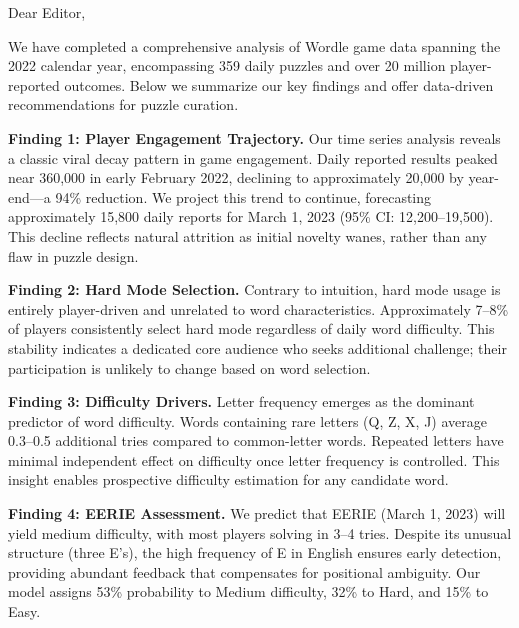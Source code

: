 \documentclass{mcmthesis}
\begin{document}
\begin{memo}[Memorandum]

Dear Editor,

We have completed a comprehensive analysis of Wordle game data spanning the 2022 calendar year, encompassing 359 daily puzzles and over 20 million player-reported outcomes. Below we summarize our key findings and offer data-driven recommendations for puzzle curation.

\textbf{Finding 1: Player Engagement Trajectory.} Our time series analysis reveals a classic viral decay pattern in game engagement. Daily reported results peaked near 360,000 in early February 2022, declining to approximately 20,000 by year-end---a 94\% reduction. We project this trend to continue, forecasting approximately 15,800 daily reports for March 1, 2023 (95\% CI: 12,200--19,500). This decline reflects natural attrition as initial novelty wanes, rather than any flaw in puzzle design.

\textbf{Finding 2: Hard Mode Selection.} Contrary to intuition, hard mode usage is entirely player-driven and unrelated to word characteristics. Approximately 7--8\% of players consistently select hard mode regardless of daily word difficulty. This stability indicates a dedicated core audience who seeks additional challenge; their participation is unlikely to change based on word selection.

\textbf{Finding 3: Difficulty Drivers.} Letter frequency emerges as the dominant predictor of word difficulty. Words containing rare letters (Q, Z, X, J) average 0.3--0.5 additional tries compared to common-letter words. Repeated letters have minimal independent effect on difficulty once letter frequency is controlled. This insight enables prospective difficulty estimation for any candidate word.

\textbf{Finding 4: EERIE Assessment.} We predict that EERIE (March 1, 2023) will yield medium difficulty, with most players solving in 3--4 tries. Despite its unusual structure (three E's), the high frequency of E in English ensures early detection, providing abundant feedback that compensates for positional ambiguity. Our model assigns 53\% probability to Medium difficulty, 32\% to Hard, and 15\% to Easy.


\end{memo}
\end{document}
